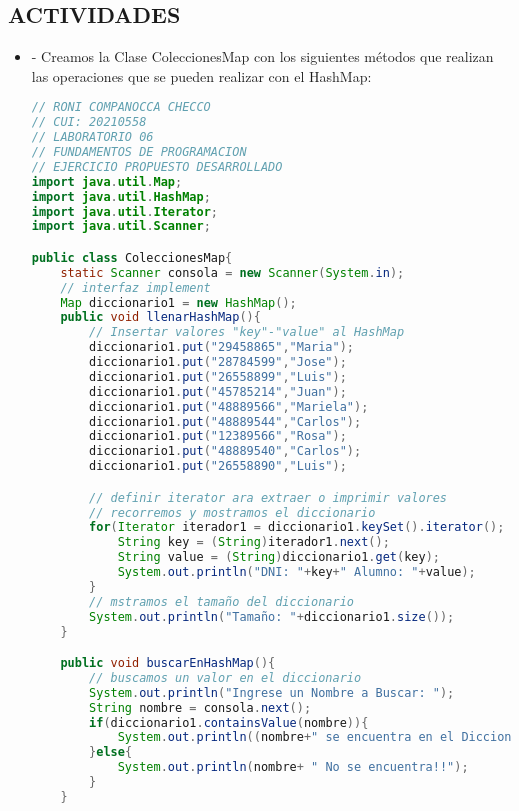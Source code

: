 \documentclass{article}
\begin{document}
\begin{itemize}
    \section{ACTIVIDADES}
	\begin{itemize}
        \subsection{EJERCICIO RESUELTO}
		\item - Creamos la Clase ColeccionesMap con los siguientes métodos que realizan las operaciones que se pueden realizar con el HashMap:

        \begin{lstlisting}[language=java]
// RONI COMPANOCCA CHECCO
// CUI: 20210558
// LABORATORIO 06
// FUNDAMENTOS DE PROGRAMACION 
// EJERCICIO PROPUESTO DESARROLLADO
import java.util.Map;
import java.util.HashMap;
import java.util.Iterator;
import java.util.Scanner;

public class ColeccionesMap{
    static Scanner consola = new Scanner(System.in);
    // interfaz implement
    Map diccionario1 = new HashMap();
    public void llenarHashMap(){
        // Insertar valores "key"-"value" al HashMap
        diccionario1.put("29458865","Maria");
        diccionario1.put("28784599","Jose");
        diccionario1.put("26558899","Luis");
        diccionario1.put("45785214","Juan");
        diccionario1.put("48889566","Mariela");
        diccionario1.put("48889544","Carlos");
        diccionario1.put("12389566","Rosa");
        diccionario1.put("48889540","Carlos");
        diccionario1.put("26558890","Luis");

        // definir iterator ara extraer o imprimir valores
        // recorremos y mostramos el diccionario
        for(Iterator iterador1 = diccionario1.keySet().iterator(); iterador1.hasNext();){
            String key = (String)iterador1.next();
            String value = (String)diccionario1.get(key);
            System.out.println("DNI: "+key+" Alumno: "+value);
        }
        // mstramos el tamaño del diccionario
        System.out.println("Tamaño: "+diccionario1.size());
    }

    public void buscarEnHashMap(){
        // buscamos un valor en el diccionario
        System.out.println("Ingrese un Nombre a Buscar: ");
        String nombre = consola.next();
        if(diccionario1.containsValue(nombre)){
            System.out.println((nombre+" se encuentra en el Diccionario"));
        }else{
            System.out.println(nombre+ " No se encuentra!!");
        }
    }


\end{lstlisting}
\end{itemize}
\end{itemize}
\end{document}
